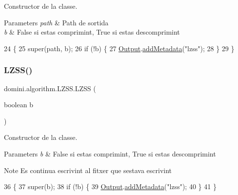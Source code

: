 Constructor de la classe. 


\begin{DoxyParams}{Parameters}
{\em path} & Path de sortida \\
\hline
{\em b} & False si estas comprimint, True si estas descomprimint \\
\hline
\end{DoxyParams}

\begin{DoxyCode}
24                                         \{
25         super(path, b);
26         \textcolor{keywordflow}{if} (!b) \{
27             \hyperlink{classdomini_1_1algorithm_1_1Algorithm_a4de9955411c656325adc391ef570c082}{Output}.\hyperlink{classpersistencia_1_1output_1_1Ctrl__Output_ae6d6857910a023982900ddc857b891f0}{addMetadata}(\textcolor{stringliteral}{"lzss"});
28         \}
29     \}
\end{DoxyCode}
\mbox{\label{classdomini_1_1algorithm_1_1LZSS_af1d7db47ad910e8bdeffb59c2f4f1caa}} 
\subsubsection{\texorpdfstring{L\+Z\+S\+S()}{LZSS()}\hspace{0.1cm}{\footnotesize\ttfamily [2/2]}}
{\footnotesize\ttfamily domini.\+algorithm.\+L\+Z\+S\+S.\+L\+Z\+SS (\begin{DoxyParamCaption}\item[{boolean}]{b }\end{DoxyParamCaption})\hspace{0.3cm}{\ttfamily [inline]}}



Constructor de la classe. 


\begin{DoxyParams}{Parameters}
{\em b} & False si estas comprimint, True si estas descomprimint \\
\hline
\end{DoxyParams}
\begin{DoxyNote}{Note}
Es continua escrivint al fitxer que s\textquotesingle{}estava escrivint 
\end{DoxyNote}

\begin{DoxyCode}
36                            \{
37         super(b);
38         \textcolor{keywordflow}{if} (!b) \{
39             \hyperlink{classdomini_1_1algorithm_1_1Algorithm_a4de9955411c656325adc391ef570c082}{Output}.\hyperlink{classpersistencia_1_1output_1_1Ctrl__Output_ae6d6857910a023982900ddc857b891f0}{addMetadata}(\textcolor{stringliteral}{"lzss"});
40         \}
41     \}
\end{DoxyCode}


